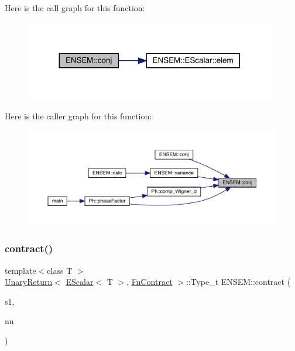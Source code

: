 Here is the call graph for this function\+:\nopagebreak
\begin{figure}[H]
\begin{center}
\leavevmode
\includegraphics[width=311pt]{d4/dca/group__escalar_ga291c7e9b7f872b3e6db0d75ff3421b6a_cgraph}
\end{center}
\end{figure}
Here is the caller graph for this function\+:
\nopagebreak
\begin{figure}[H]
\begin{center}
\leavevmode
\includegraphics[width=350pt]{d4/dca/group__escalar_ga291c7e9b7f872b3e6db0d75ff3421b6a_icgraph}
\end{center}
\end{figure}
\mbox{\label{group__escalar_ga6c04652cc005e69e9785effa182a8436}} 
\subsubsection{\texorpdfstring{contract()}{contract()}}
{\footnotesize\ttfamily template$<$class T $>$ \\
\mbox{\hyperlink{structENSEM_1_1UnaryReturn}{Unary\+Return}}$<$ \mbox{\hyperlink{classENSEM_1_1EScalar}{E\+Scalar}}$<$ T $>$, \mbox{\hyperlink{structENSEM_1_1FnContract}{Fn\+Contract}} $>$\+::Type\+\_\+t E\+N\+S\+E\+M\+::contract (\begin{DoxyParamCaption}\item[{const \mbox{\hyperlink{classENSEM_1_1EScalar}{E\+Scalar}}$<$ T $>$ \&}]{s1,  }\item[{const \mbox{\hyperlink{classXMLArray_1_1Array}{Array}}$<$ int $>$ \&}]{nn }\end{DoxyParamCaption})\hspace{0.3cm}{\ttfamily [inline]}}

